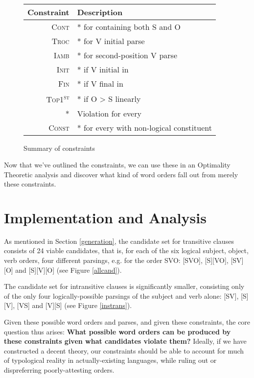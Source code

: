 \documentclass{article}
\newcommand{\cont}{\textsc{Cont}}
\newcommand{\iamb}{\textsc{Iamb}}
\newcommand{\cons}{\textsc{Const}}
\newcommand{\topf}{\textsc{Top1\textsuperscript{st}}}
\newcommand{\nophi}{\textsc{*\textphi}}
\newcommand{\finphi}{\textsc{Fin\textphi}}
\newcommand{\initphi}{\textsc{Init\textphi}}
\newcommand{\troc}{\textsc{Troc}}
\begin{document}
 \begin{figure}
	 \begin{center}
		 \begin{tabular}{rl}
			 Constraint&Description\\\hline\hline
			 \cont&* for {\textphi} containing both S and O\\
			 \troc&* for V initial parse\\
			 \iamb&* for second-position V parse\\
			 \initphi&* if V initial in \textphi\\
			 \finphi&* if V final in \textphi\\
			 \topf&* if O {\textgreater} S linearly\\
			 \nophi&Violation for every {\textphi}\\
			 \cons&* for every {\textphi} with non-logical constituent \\
		 \end{tabular}
	 \end{center}

	 \caption{Summary of constraints\label{consum}}
 \end{figure}

 Now that we've outlined the constraints, we can use these in an Optimality Theoretic analysis and discover what kind of word orders fall out from merely these constraints.

\section{Implementation and Analysis}


As mentioned in Section \ref{generation}, the candidate set for transitive clauses consists of 24 viable candidates, that is, for each of the six logical subject, object, verb orders, four different parsings, e.g. for the order SVO: [SVO], [S][VO], [SV][O] and [S][V][O] (see Figure \ref{allcand}).

The candidate set for intransitive clauses is significantly smaller, consisting only of the only four logically-possible parsings of the subject and verb alone: [SV], [S][V], [VS] and [V][S] (see Figure \ref{instrans}).

Given these possible word orders and parses, and given these constraints, the core question thus arises: \textbf{What possible word orders  can be produced by these constraints given what candidates violate them?}
Ideally, if we have constructed a decent theory, our constraints should be able to account for much of typological reality in actually-existing languages, while ruling out or dispreferring poorly-attesting orders.
\end{document}
